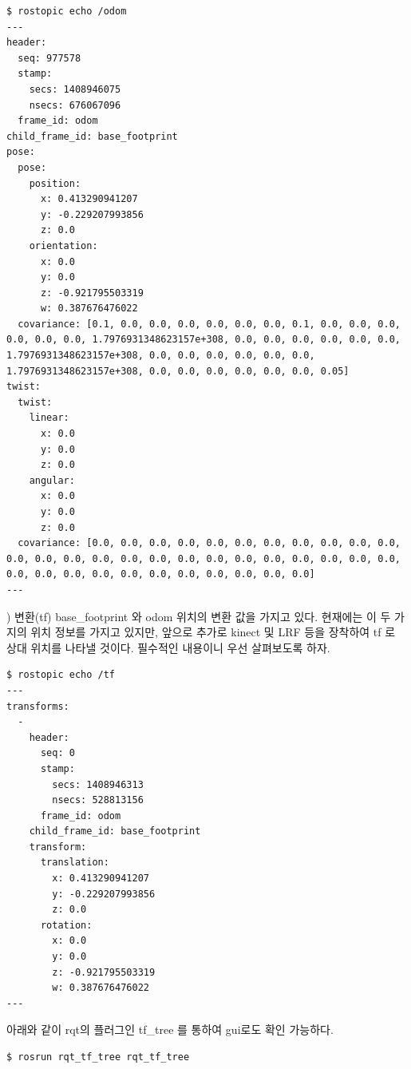 \vspace{\baselineskip}
\begin{lstlisting}[language=ROS]
$ rostopic echo /odom
---
header: 
  seq: 977578
  stamp: 
    secs: 1408946075
    nsecs: 676067096
  frame_id: odom
child_frame_id: base_footprint
pose: 
  pose: 
    position: 
      x: 0.413290941207
      y: -0.229207993856
      z: 0.0
    orientation: 
      x: 0.0
      y: 0.0
      z: -0.921795503319
      w: 0.387676476022
  covariance: [0.1, 0.0, 0.0, 0.0, 0.0, 0.0, 0.0, 0.1, 0.0, 0.0, 0.0, 0.0, 0.0, 0.0, 1.7976931348623157e+308, 0.0, 0.0, 0.0, 0.0, 0.0, 0.0, 1.7976931348623157e+308, 0.0, 0.0, 0.0, 0.0, 0.0, 0.0, 1.7976931348623157e+308, 0.0, 0.0, 0.0, 0.0, 0.0, 0.0, 0.05]
twist: 
  twist: 
    linear: 
      x: 0.0
      y: 0.0
      z: 0.0
    angular: 
      x: 0.0
      y: 0.0
      z: 0.0
  covariance: [0.0, 0.0, 0.0, 0.0, 0.0, 0.0, 0.0, 0.0, 0.0, 0.0, 0.0, 0.0, 0.0, 0.0, 0.0, 0.0, 0.0, 0.0, 0.0, 0.0, 0.0, 0.0, 0.0, 0.0, 0.0, 0.0, 0.0, 0.0, 0.0, 0.0, 0.0, 0.0, 0.0, 0.0, 0.0, 0.0]
---
\end{lstlisting}

\vspace{\baselineskip}
\noindent
{}
\thenum) 변환(tf)
base\_footprint 와 odom 위치의 변환 값을 가지고 있다. 현재에는 이 두 가지의 위치 정보를 가지고 있지만, 앞으로 추가로 kinect 및 LRF 등을 장착하여 tf 로 상대 위치를 나타낼 것이다. 필수적인 내용이니 우선 살펴보도록 하자.

\vspace{\baselineskip}
\begin{lstlisting}[language=ROS]
$ rostopic echo /tf
---
transforms: 
  - 
    header: 
      seq: 0
      stamp: 
        secs: 1408946313
        nsecs: 528813156
      frame_id: odom
    child_frame_id: base_footprint
    transform: 
      translation: 
        x: 0.413290941207
        y: -0.229207993856
        z: 0.0
      rotation: 
        x: 0.0
        y: 0.0
        z: -0.921795503319
        w: 0.387676476022
---
\end{lstlisting}

아래와 같이 rqt의 플러그인 tf\_tree 를 통하여 gui로도 확인 가능하다.

\vspace{\baselineskip}
\begin{lstlisting}[language=ROS]
$ rosrun rqt_tf_tree rqt_tf_tree 
\end{lstlisting}

